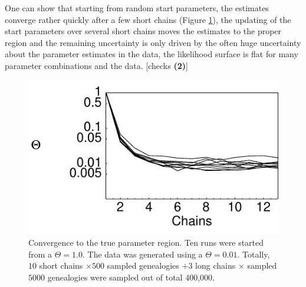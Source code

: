 One can show that starting from random start parameters, the estimates
converge rather quickly after a few short chains (Figure \ref{fig:convergence}), the updating of
the start parameters over several short chains moves the estimates to the
proper region and the remaining uncertainty is only driven by the
often huge uncertainty about the parameter estimates in the data, 
the likelihood surface is flat for many parameter combinations and 
the data. [checks \textbf{ (2)}] 
\begin{figure}[hpbt]
\begin{center}
\includegraphics[width=12cm]{mim/convergence_singlepop}
\end{center}
\vskip -0.5cm
\caption{Convergence to the true parameter region. 
Ten runs were started from a $\Theta=1.0$. The data was generated using
a $\Theta=0.01$.
Totally, $10$ short chains $\times 500$ sampled genealogies 
$+ 3$ long chains $\times$ sampled $5000$ genealogies were sampled out of
total 400,000.
}
\label{fig:convergence}
\end{figure}

